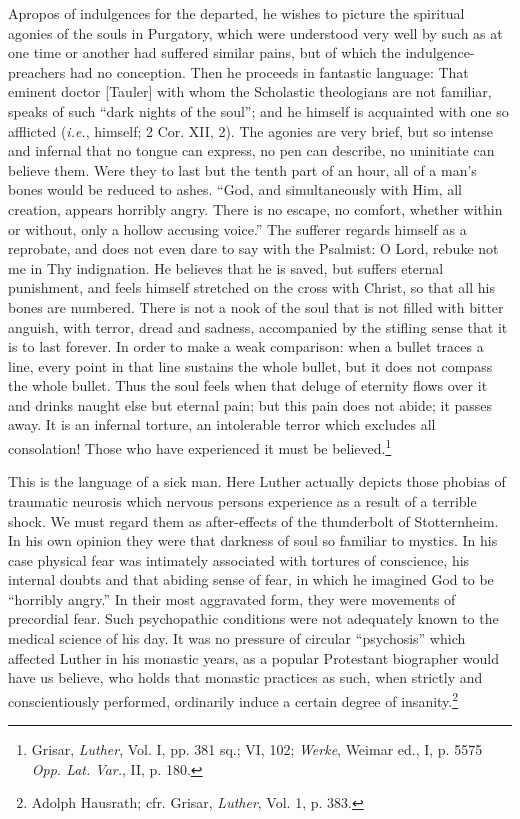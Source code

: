Apropos of indulgences for the departed, he wishes to picture the spiritual
agonies of the souls in Purgatory, which were understood very well by such
as at one time or another had suffered similar pains, but of which the
indulgence-preachers had no conception. Then he proceeds in fantastic language:
That eminent doctor [Tauler] with whom the Scholastic theologians
are not familiar, speaks of such “dark nights of the soul”; and he himself is
acquainted with one so afflicted (\textit{i.e.}, himself; 2 Cor. XII, 2).
The agonies are very brief, but so intense and infernal that no tongue can
express, no pen can describe, no uninitiate can believe them.
Were they to last but the tenth part of an hour, all of a man’s bones would
be reduced to ashes. “God, and simultaneously with Him, all creation,
appears horribly angry. There is no escape, no comfort, whether within or
without, only a hollow accusing voice.” The sufferer regards himself as a
reprobate, and does not even dare to say with the Psalmist: O Lord, rebuke
not me in Thy indignation. He believes that he is saved, but suffers eternal
punishment, and feels himself stretched on the cross with Christ, so that
all his bones are numbered. There is not a nook of the soul that is not filled
with bitter anguish, with terror, dread and sadness, accompanied by the
stifling sense that it is to last forever. In order to make a weak comparison:
when a bullet traces a line, every point in that line sustains the whole bullet,
but it does not compass the whole bullet. Thus the soul feels when that
deluge of eternity flows over it and drinks naught else but eternal pain;
but this pain does not abide; it passes away. It is an infernal torture, an
intolerable terror which excludes all consolation! Those who have experienced it must be believed.\footnote
{Grisar, \textit{Luther}, Vol. I, pp. 381 sq.; VI, 102; \textit{Werke}, Weimar ed., I, p. 5575 \textit{Opp. Lat.
Var.}, II, p. 180. }

This is the language of a sick man. Here Luther actually depicts
those phobias of traumatic neurosis which nervous persons experience
as a result of a terrible shock. We must regard them as after-effects
of the thunderbolt of Stotternheim. In his own opinion they were
that darkness of soul so familiar to mystics. In his case physical
fear was intimately associated with tortures of conscience, his internal
doubts and that abiding sense of fear, in which he imagined
God to be “horribly angry.” In their most aggravated form, they
were movements of precordial fear. Such psychopathic conditions
were not adequately known to the medical science of his day. It was
no pressure of circular “psychosis” which affected Luther in his
monastic years, as a popular Protestant biographer would have us
believe, who holds that monastic practices as such, when strictly and
conscientiously performed, ordinarily induce a certain degree of insanity.\footnote
{Adolph Hausrath; cfr. Grisar, \textit{Luther}, Vol. 1, p. 383.}

